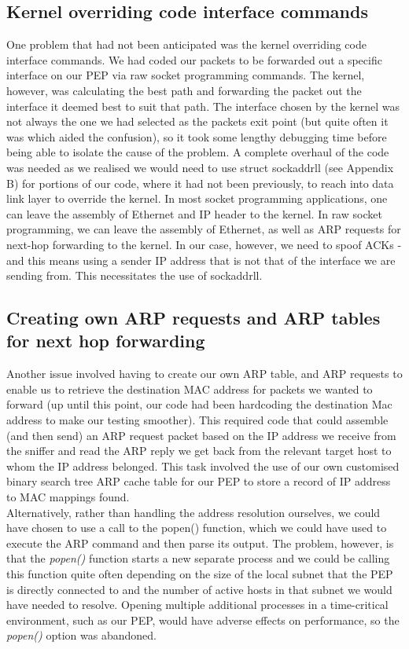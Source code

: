 \documentclass{uathesis}
\begin{document}
\begin{appendices}
\subsection{Kernel overriding code interface commands}
One problem that had not been anticipated was the kernel overriding code interface commands. We had coded our packets to be forwarded out a specific interface on our PEP via raw socket programming commands. The kernel, however, was calculating the best path and forwarding the packet out the interface it deemed best to suit that path. The interface chosen by the kernel was not always the one we had selected as the packets exit point (but quite often it was which aided the confusion), so it took some lengthy debugging time before being able to isolate the cause of the problem. A complete overhaul of the code was needed as we realised we would need to use struct sockaddr\textunderscore ll (see Appendix B)  for portions of our code, where it had not been previously, to reach into data link layer to override the kernel. 
In most socket programming applications, one can leave the assembly of Ethernet and IP header to the kernel. In raw socket programming, we can leave the assembly of Ethernet, as well as ARP requests for next-hop forwarding to the kernel. In our case, however, we need to spoof ACKs - and this means using a sender IP address that is not that of the interface we are sending from. This necessitates the use of sockaddr\textunderscore ll. 

\subsection{Creating own ARP requests and ARP tables for next hop forwarding}
Another issue involved having to create our own ARP table, and ARP requests to enable us to retrieve the destination MAC address for packets we wanted to forward (up until this point, our code had been hardcoding the destination Mac address to make our testing smoother). This required code that could assemble (and then send) an ARP request packet based on the IP address we receive from the sniffer and read the ARP reply we get back from the relevant target host to whom the IP address belonged. This task involved the use of our own customised binary search tree ARP cache table for our PEP to store a record of IP address to MAC mappings found.  \\

Alternatively, rather than handling the address resolution ourselves, we could have chosen to use a call to the popen() function, which we could have used to execute the ARP command and then parse its output. The problem, however, is that the \emph{popen()} function starts a new separate process and we could be calling this function quite often depending on the size of the local subnet that the PEP is directly connected to and the number of active hosts in that subnet we would have needed to resolve. Opening multiple additional processes in a time-critical environment, such as our PEP, would have adverse effects on performance, so the \emph{popen()} option was abandoned. \\


\end{appendices}
\end{document}
